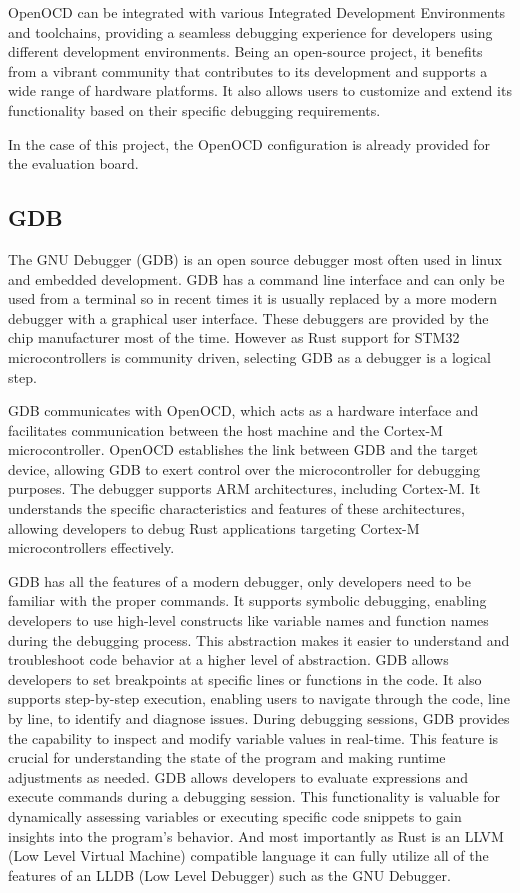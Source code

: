 OpenOCD can be integrated with various Integrated Development Environments and toolchains, providing a seamless debugging experience for developers using different development environments. Being an open-source project, it benefits from a vibrant community that contributes to its development and supports a wide range of hardware platforms. It also allows users to customize and extend its functionality based on their specific debugging requirements.

In the case of this project, the OpenOCD configuration is already provided for the evaluation board. \cite{OpenocdConfigFile}

\subsection{GDB}

The GNU Debugger (GDB) is an open source debugger most often used in linux and embedded development. GDB has a command line interface and can only be used from a terminal so in recent times it is usually replaced by a more modern debugger with a graphical user interface. These debuggers are provided by the chip manufacturer most of the time. However as Rust support for STM32 microcontrollers is community driven, selecting GDB as a debugger is a logical step.

GDB communicates with OpenOCD, which acts as a hardware interface and facilitates communication between the host machine and the Cortex-M microcontroller. OpenOCD establishes the link between GDB and the target device, allowing GDB to exert control over the microcontroller for debugging purposes. The debugger supports ARM architectures, including Cortex-M. It understands the specific characteristics and features of these architectures, allowing developers to debug Rust applications targeting Cortex-M microcontrollers effectively.

GDB has all the features of a modern debugger, only developers need to be familiar with the proper commands. It supports symbolic debugging, enabling developers to use high-level constructs like variable names and function names during the debugging process. This abstraction makes it easier to understand and troubleshoot code behavior at a higher level of abstraction. GDB allows developers to set breakpoints at specific lines or functions in the code. It also supports step-by-step execution, enabling users to navigate through the code, line by line, to identify and diagnose issues. During debugging sessions, GDB provides the capability to inspect and modify variable values in real-time. This feature is crucial for understanding the state of the program and making runtime adjustments as needed. GDB allows developers to evaluate expressions and execute commands during a debugging session. This functionality is valuable for dynamically assessing variables or executing specific code snippets to gain insights into the program's behavior. And most importantly as Rust is an LLVM (Low Level Virtual Machine) compatible language it can fully utilize all of the features of an LLDB (Low Level Debugger) such as the GNU Debugger.

